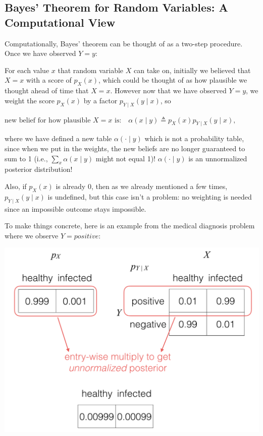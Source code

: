 \documentclass[6008notes.tex]{subfiles}
\begin{document}
\subsection{Bayes' Theorem for Random Variables: A Computational View}

Computationally, Bayes' theorem can be thought of as a two-step procedure. Once we have observed $Y=y$:

For each value $x$ that random variable $X$ can take on, initially we believed that $X=x$ with a score of $p_X(x)$, which could be thought of as how plausible we thought ahead of time that $X=x$. However now that we have observed $Y=y$, we weight the score $p_X(x)$ by a factor $p_{Y\mid X}(y\mid x)$, so

{\centering$\text {new belief for how plausible }X=x\text { is:}\quad \alpha (x\mid y)\triangleq p_{X}(x)p_{Y\mid X}(y\mid x),$ \par}

where we have defined a new table $\alpha (\cdot \mid y)$ which is not a probability table, since when we put in the weights, the new beliefs are no longer guaranteed to sum to 1 (i.e., $\sum _{x}\alpha (x\mid y)$ might not equal 1)! $\alpha (\cdot \mid y)$ is an unnormalized posterior distribution!

Also, if $p_X(x)$ is already 0, then as we already mentioned a few times, $p_{Y\mid X}(y\mid x)$ is undefined, but this case isn't a problem: no weighting is needed since an impossible outcome stays impossible.

To make things concrete, here is an example from the medical diagnosis problem where we observe $Y=positive$:

{\centering\includegraphics[scale=0.3]{images_sec-bayes-computational-view} \par}
\end{document}
